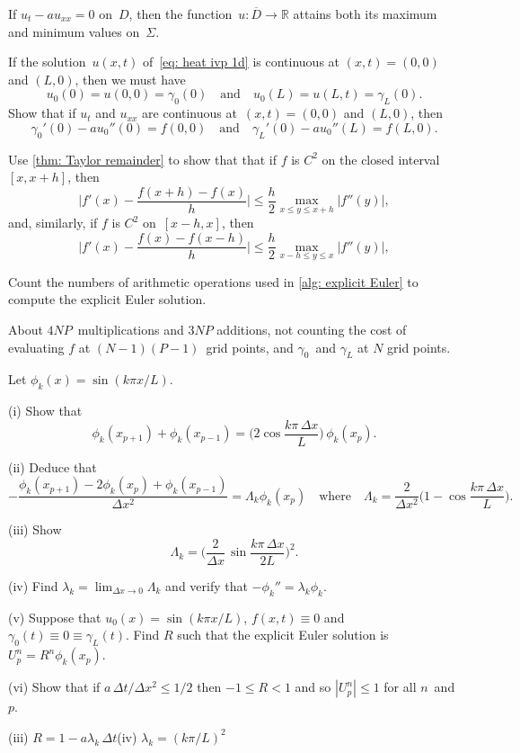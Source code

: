 \begin{corollary}
If $u_t-au_{xx}=0$ on~$D$, then the function~$u:\overline{D}\to\mathbb{R}$
attains both its maximum and minimum values on~$\Sigma$.
\end{corollary}





\begin{Exercises}

\exercise
If the solution~$u(x,t)$ of~\eqref{eq: heat ivp 1d} is continuous
at $(x,t)=(0,0)$ and $(L,0)$, then we must have
\[
u_0(0)=u(0,0)=\gamma_0(0)\quad\text{and}\quad
u_0(L)=u(L,t)=\gamma_L(0).
\]
Show that if $u_t$ and $u_{xx}$ are continuous at~$(x,t)=(0,0)$ and $(L,0)$,
then
\[
\gamma_0'(0)-au_0''(0)=f(0,0)
\quad\text{and}\quad
\gamma_L'(0)-au_0''(L)=f(L,0).
\]

\exercise\label{ex: forward diff}
Use \cref{thm: Taylor remainder} to show that that if $f$ is $C^2$ on 
the closed interval~$[x,x+h]$, then
\[
\biggl|f'(x)-\frac{f(x+h)-f(x)}{h}\biggr|
	\le\frac{h}{2}\max_{x\le y\le x+h}|f''(y)|,
\]
and, similarly, if $f$ is $C^2$ on~$[x-h,x]$, then
\[
\biggl|f'(x)-\frac{f(x)-f(x-h)}{h}\biggr|
	\le\frac{h}{2}\max_{x-h\le y\le x}|f''(y)|,
\]

\exercise
Count the numbers of arithmetic operations used in \cref{alg: explicit Euler} 
to compute the explicit Euler solution.
\begin{ans}
About $4NP$~multiplications and $3NP$ additions, not counting the cost of
evaluating $f$ at $(N-1)(P-1)$~grid points, and $\gamma_0$~and $\gamma_L$
at $N$ grid points.
\end{ans}

\exercise
Let $\phi_k(x)=\sin(k\pi x/L)$.
\begin{description}
\item{(i)} Show that 
\[
\phi_k(x_{p+1})+\phi_k(x_{p-1})=\biggl(2\cos\frac{k\pi\,\Delta x}{L}\biggr)\,
	\phi_k(x_p).
\]
\item{(ii)} Deduce that
\[
-\frac{\phi_k(x_{p+1})-2\phi_k(x_p)+\phi_k(x_{p-1})}{\Delta x^2}
	=\Lambda_k\phi_k(x_p)\quad\text{where}\quad
\Lambda_k=\frac{2}{\Delta x^2}\biggl(1-\cos\frac{k\pi\,\Delta x}{L}\biggr).
\]
\item{(iii)} Show
\[
\Lambda_k=\biggl(\frac{2}{\Delta x}\,\sin\frac{k\pi\,\Delta x}{2L}\biggr)^2.
\]
\item{(iv)}
Find $\lambda_k=\lim_{\Delta x\to0}\Lambda_k$ and verify that 
$-\phi_k''=\lambda_k\phi_k$.
\item{(v)}
Suppose that $u_0(x)=\sin(k\pi x/L)$, $f(x,t)\equiv0$ and 
$\gamma_0(t)\equiv 0\equiv\gamma_L(t)$.  Find $R$ such that the explicit
Euler solution is~$U^n_p=R^n\phi_k(x_p)$.
\item{(vi)} Show that if $a\,\Delta t/\Delta x^2\le1/2$ then $-1\le R<1$
and so $|U^n_p|\le1$ for all $n$~and $p$.
\end{description}
\begin{ans}
(iii) $R=1-a\lambda_k\,\Delta t$\quad(iv) $\lambda_k=(k\pi/L)^2$
\end{ans}


\end{Exercises}
